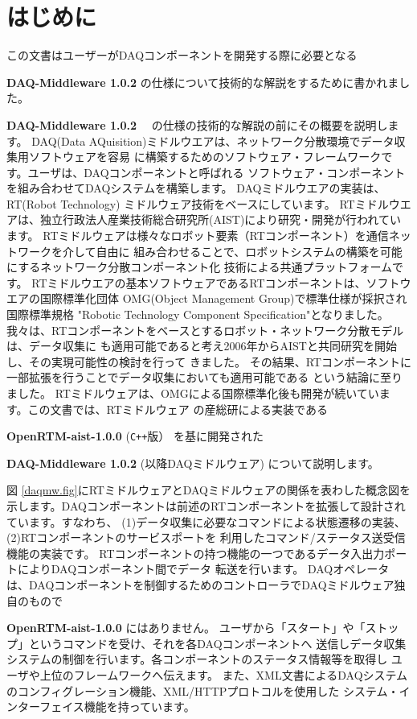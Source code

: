 \documentclass[a4j,10pt,dvips,onecolumn,oneside,final]{jarticle}%
\newcommand {\daqmwcurrent} {
	{\bf DAQ-Middleware 1.0.2}
}
\newcommand {\rtmcurrent} {
	{\bf OpenRTM-aist-1.0.0}
}
\begin{document}
\section{はじめに}\label{intro}
この文書はユーザーがDAQコンポーネントを開発する際に必要となる
\daqmwcurrent の仕様について技術的な解説をするために書かれました。
\daqmwcurrent　の仕様の技術的な解説の前にその概要を説明します。
DAQ(Data AQuisition)ミドルウエアは、ネットワーク分散環境でデータ収集用ソフトウェアを容易
に構築するためのソフトウェア・フレームワークです。ユーザは、DAQコンポーネントと呼ばれる
ソフトウェア・コンポーネントを組み合わせてDAQシステムを構築します。
DAQミドルウエアの実装は、RT(Robot Technology) ミドルウェア\cite{RTM}技術をベースにしています。
RTミドルウエアは、独立行政法人産業技術総合研究所(AIST)により研究・開発が行われています。
RTミドルウェアは様々なロボット要素（RTコンポーネント）を通信ネットワークを介して自由に
組み合わせることで、ロボットシステムの構築を可能にするネットワーク分散コンポーネント化
技術による共通プラットフォームです。
RTミドルウエアの基本ソフトウェアであるRTコンポーネントは、ソフトウエアの国際標準化団体
OMG(Object Management Group)で標準仕様が採択され国際標準規格 
"Robotic Technology Component Specification"\cite{RTM-OMG}となりました。
我々は、RTコンポーネントをベースとするロボット・ネットワーク分散モデルは、データ収集に
も適用可能であると考え2006年からAISTと共同研究を開始し、その実現可能性の検討を行って
きました\cite{CHEP06}。%
その結果、RTコンポーネントに一部拡張を行うことでデータ収集においても適用可能である
という結論に至りました。
RTミドルウェアは、OMGによる国際標準化後も開発が続いています。この文書では、RTミドルウェア
の産総研による実装である
\rtmcurrent (\verb|C++|版）
を基に開発された
\daqmwcurrent(以降DAQミドルウェア)
について説明します。

図 \ref{daqmw.fig}にRTミドルウェアとDAQミドルウェアの関係を表わした概念図を
示します。DAQコンポーネントは前述のRTコンポーネントを拡張して設計されています。すなわち、
(1)データ収集に必要なコマンドによる状態遷移の実装、(2)RTコンポーネントのサービスポートを
利用したコマンド/ステータス送受信機能の実装です。
RTコンポーネントの持つ機能の一つであるデータ入出力ポートによりDAQコンポーネント間でデータ
転送を行います。
DAQオペレータは、DAQコンポーネントを制御するためのコントローラでDAQミドルウェア独自のもので
\rtmcurrent にはありません。
ユーザから「スタート」や「ストップ」というコマンドを受け、それを各DAQコンポーネントへ
送信しデータ収集システムの制御を行います。各コンポーネントのステータス情報等を取得し
ユーザや上位のフレームワークへ伝えます。
また、XML文書によるDAQシステムのコンフィグレーション機能、XML/HTTPプロトコルを使用した
システム・インターフェイス機能を持っています。
\end{document}
